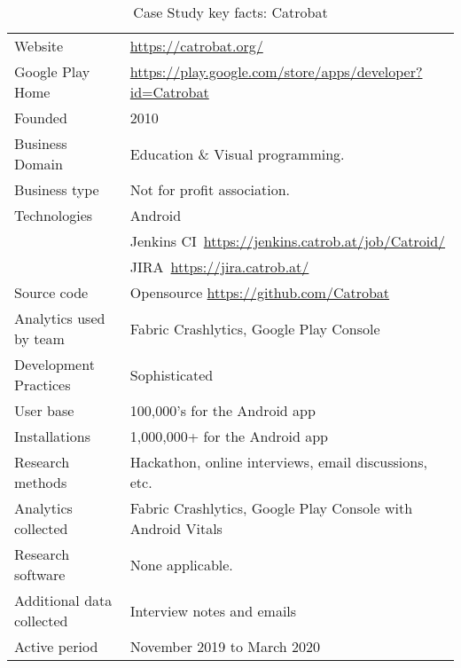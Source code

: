 {\renewcommand{\arraystretch}{0.8}%
\begin{table*}
    \centering
    \small
    \setlength{\tabcolsep}{6pt}
    \begin{tabular}{lp{11cm}}
       \toprule
       Website &\url{https://catrobat.org/} \\
       Google Play Home & \url{https://play.google.com/store/apps/developer?id=Catrobat} \\
       Founded & 2010 \\
       Business Domain & Education \& Visual programming. \\
       Business type & Not for profit association. \\
       Technologies  & Android \\
       & Jenkins CI~\url{https://jenkins.catrob.at/job/Catroid/}  \\
       & JIRA~\url{https://jira.catrob.at/} \\
       Source code  & Opensource \url{https://github.com/Catrobat} \\
       Analytics used by team & Fabric Crashlytics, Google Play Console \\
       Development Practices & Sophisticated~\footnotemark \\
       \midrule
       User base & 100,000's for the Android app \\
       Installations & 1,000,000+ for the Android app \\
       \midrule
       Research methods &Hackathon, online interviews, email discussions, etc. \\
       Analytics collected &Fabric Crashlytics, Google Play Console with Android Vitals \\
       Research software & None applicable. \\
       Additional data collected &Interview notes and emails \\
       Active period & November 2019 to March 2020 \\
       \bottomrule
    \end{tabular}
    \caption{Case Study key facts: Catrobat}
    \label{tab:catrobat_case_study_anaytics_overview}
\end{table*}
}


